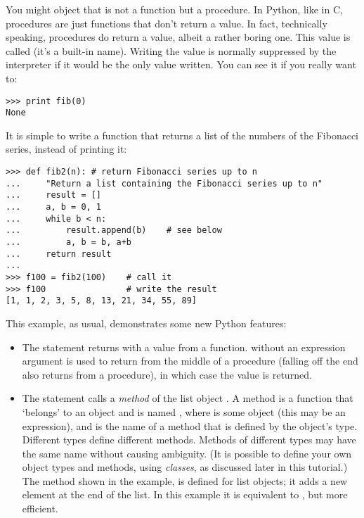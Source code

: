 \documentclass{manual}
\begin{document}
You might object that  is not a function but a procedure.  In
Python, like in C, procedures are just functions that don't return a
value.  In fact, technically speaking, procedures do return a value,
albeit a rather boring one.  This value is called  (it's a
built-in name).  Writing the value  is normally suppressed by
the interpreter if it would be the only value written.  You can see it
if you really want to:

\begin{verbatim}
>>> print fib(0)
None
\end{verbatim}

It is simple to write a function that returns a list of the numbers of
the Fibonacci series, instead of printing it:

\begin{verbatim}
>>> def fib2(n): # return Fibonacci series up to n
...     "Return a list containing the Fibonacci series up to n"
...     result = []
...     a, b = 0, 1
...     while b < n:
...         result.append(b)    # see below
...         a, b = b, a+b
...     return result
... 
>>> f100 = fib2(100)    # call it
>>> f100                # write the result
[1, 1, 2, 3, 5, 8, 13, 21, 34, 55, 89]
\end{verbatim}
%
This example, as usual, demonstrates some new Python features:

\begin{itemize}

\item
The  statement returns with a value from a function.
 without an expression argument is used to return from 
the middle of a procedure (falling off the end also returns from a
procedure), in which case the  value is returned.

\item
The statement  calls a \emph{method} of the list
object .  A method is a function that `belongs' to an
object and is named , where  is some
object (this may be an expression), and  is the name
of a method that is defined by the object's type.  Different types
define different methods.  Methods of different types may have the
same name without causing ambiguity.  (It is possible to define your
own object types and methods, using \emph{classes}, as discussed later
in this tutorial.)
The method  shown in the example, is defined for
list objects; it adds a new element at the end of the list.  In this
example it is equivalent to , but more
efficient.

\end{itemize}
\end{document}
